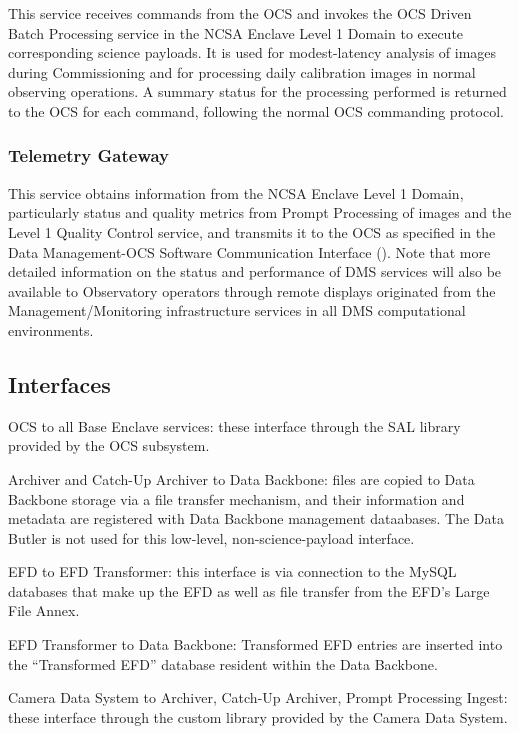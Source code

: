 \documentclass[DM,lsstdraft,toc]{lsstdoc}
\begin{document}
This service receives commands from the OCS and invokes the OCS Driven
Batch Processing service in the NCSA Enclave Level 1 Domain to execute
corresponding science payloads. It is used for modest-latency analysis
of images during Commissioning and for processing daily calibration
images in normal observing operations. A summary status for the
processing performed is returned to the OCS for each command, following
the normal OCS commanding protocol.

\subsubsection{Telemetry Gateway}\label{telemetry-gateway}

This service obtains information from the NCSA Enclave Level 1 Domain,
particularly status and quality metrics from Prompt Processing of images
and the Level 1 Quality Control service, and transmits it to the OCS as
specified in the Data Management-OCS Software Communication Interface
(). Note that more detailed information on the status and
performance of DMS services will also be available to Observatory
operators through remote displays originated from the
Management/Monitoring infrastructure services in all DMS computational
environments.

\subsection{Interfaces}\label{base-interfaces}

OCS to all Base Enclave services: these interface through the SAL
library provided by the OCS subsystem.

Archiver and Catch-Up Archiver to Data Backbone: files are copied to
Data Backbone storage via a file transfer mechanism, and their
information and metadata are registered with Data Backbone management
dataabases. The Data Butler is not used for this low-level,
non-science-payload interface.

EFD to EFD Transformer: this interface is via connection to the MySQL
databases that make up the EFD as well as file transfer from the EFD's
Large File Annex.

EFD Transformer to Data Backbone: Transformed EFD entries are inserted
into the ``Transformed EFD'' database resident within the Data Backbone.

Camera Data System to Archiver, Catch-Up Archiver, Prompt Processing
Ingest: these interface through the custom library provided by the
Camera Data System.
\end{document}
